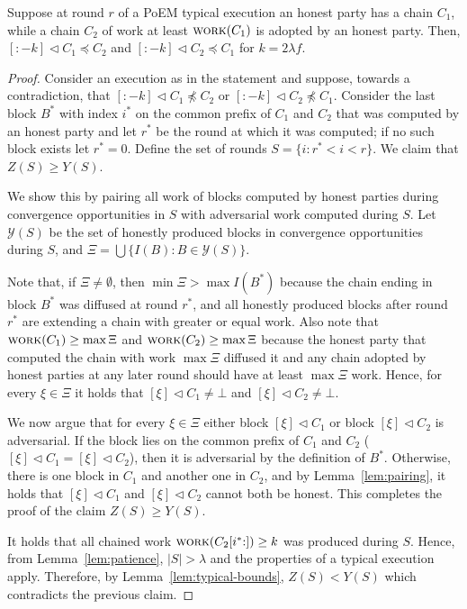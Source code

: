 \begin{lemma} \label{lem:common-prefix-lemma}
  Suppose at round $r$ of a PoEM typical execution an honest party has a chain
  $C_1$, while a chain $C_2$ of work at least $\textsc{work}(C_1)$ is adopted by an honest party.
  Then, $[{:}{-k}] \lhd C_1 \preccurlyeq C_2$ and $[{:}{-k}] \lhd C_2 \preccurlyeq C_1$
  for $k = 2 \lambda f$. 
\end{lemma}
\begin{proof}
    Consider an execution as in the statement and suppose,
    towards a contradiction, that $[{:}{-k}] \lhd C_1 \not \preccurlyeq C_2$
    or $[{:}{-k}] \lhd C_2 \not \preccurlyeq C_1$.
    Consider the last block $B^*$ with index $i^*$ on the common prefix of
    $C_1$ and $C_2$ that was computed by an honest party and let $r^*$
    be the round at which it was computed; if no such block exists let $r^* = 0$.
    Define the set of rounds $S = \{i: r^* < i < r\}$. We claim that
    $Z(S) \geq Y(S)$.

    We show this by pairing all work of blocks computed by honest parties during
    convergence opportunities in $S$ with adversarial work computed during $S$.
    Let $\mathcal{Y}(S)$ be the set of honestly produced blocks in convergence opportunities
    during $S$, and $\Xi = \bigcup \{I(B): B \in \mathcal{Y}(S)\}$.

    Note that, if $\Xi \neq \emptyset$, then $\min{\Xi} > \max{I(B^*)}$
    because the chain ending in block $B^*$
    was diffused at round $r^*$, and all honestly produced blocks after round $r^*$
    are extending a chain with greater or equal work.
    Also note that $\textsc{work}(C_1) \geq \max{\Xi}$ and $\textsc{work}(C_2) \geq \max{\Xi}$ because
    the honest party that computed the chain with work $\max \Xi$ diffused it and any chain adopted
    by honest parties at any later round should have at least $\max \Xi$ work.
    Hence, for every $\xi \in \Xi$ it holds that
    $[\xi] \lhd C_1 \neq \bot$ and $[\xi] \lhd C_2 \neq \bot$.

    We now argue that for every $\xi \in \Xi$ either block $[\xi] \lhd C_1$
    or block $[\xi] \lhd C_2$ is adversarial. If the block lies on the
    common prefix of $C_1$ and $C_2$ ($[\xi] \lhd C_1 = [\xi] \lhd C_2$),
    then it is adversarial by the definition of $B^*$. Otherwise,
    there is one block in $C_1$ and another one in $C_2$, and by
    Lemma~\ref{lem:pairing}, it holds that $[\xi] \lhd C_1$ and
    $[\xi] \lhd C_2$ cannot both be honest.
    This completes the proof of the claim $Z(S) \geq Y(S)$.

    It holds that all chained work $\textsc{work}(C_2[{i^*} {:}]) \geq k$
    was produced during $S$.
    Hence, from Lemma~\ref{lem:patience}, $|S| > \lambda$ and
    the properties of a typical execution apply.
    Therefore, by Lemma~\ref{lem:typical-bounds},
    $Z(S) < Y(S)$ which contradicts the previous claim. \Qed
\end{proof}

